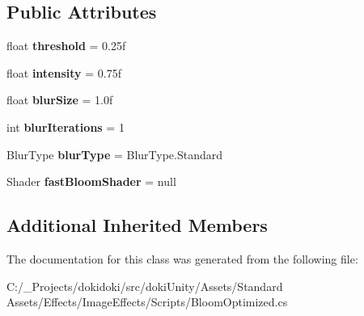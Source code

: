 \subsection*{Public Attributes}
\begin{DoxyCompactItemize}
\item 
float {\bfseries threshold} = 0.\+25f\hypertarget{class_unity_standard_assets_1_1_image_effects_1_1_bloom_optimized_a0ef0dd7b3e5ffb8f00cf4205470801ee}{}\label{class_unity_standard_assets_1_1_image_effects_1_1_bloom_optimized_a0ef0dd7b3e5ffb8f00cf4205470801ee}

\item 
float {\bfseries intensity} = 0.\+75f\hypertarget{class_unity_standard_assets_1_1_image_effects_1_1_bloom_optimized_a8ec9def7b3e5665976eafa9d258fd394}{}\label{class_unity_standard_assets_1_1_image_effects_1_1_bloom_optimized_a8ec9def7b3e5665976eafa9d258fd394}

\item 
float {\bfseries blur\+Size} = 1.\+0f\hypertarget{class_unity_standard_assets_1_1_image_effects_1_1_bloom_optimized_ad48371677d49eada1100c19f3f8a977c}{}\label{class_unity_standard_assets_1_1_image_effects_1_1_bloom_optimized_ad48371677d49eada1100c19f3f8a977c}

\item 
int {\bfseries blur\+Iterations} = 1\hypertarget{class_unity_standard_assets_1_1_image_effects_1_1_bloom_optimized_a8ff2522b67093656401cd6d2639ebb78}{}\label{class_unity_standard_assets_1_1_image_effects_1_1_bloom_optimized_a8ff2522b67093656401cd6d2639ebb78}

\item 
Blur\+Type {\bfseries blur\+Type} = Blur\+Type.\+Standard\hypertarget{class_unity_standard_assets_1_1_image_effects_1_1_bloom_optimized_acb813777e2dbedf40aecc524f7551af6}{}\label{class_unity_standard_assets_1_1_image_effects_1_1_bloom_optimized_acb813777e2dbedf40aecc524f7551af6}

\item 
Shader {\bfseries fast\+Bloom\+Shader} = null\hypertarget{class_unity_standard_assets_1_1_image_effects_1_1_bloom_optimized_a68b688b90f439f8b2364d1aa275a69e0}{}\label{class_unity_standard_assets_1_1_image_effects_1_1_bloom_optimized_a68b688b90f439f8b2364d1aa275a69e0}

\end{DoxyCompactItemize}
\subsection*{Additional Inherited Members}


The documentation for this class was generated from the following file\+:\begin{DoxyCompactItemize}
\item 
C\+:/\+\_\+\+Projects/dokidoki/src/doki\+Unity/\+Assets/\+Standard Assets/\+Effects/\+Image\+Effects/\+Scripts/Bloom\+Optimized.\+cs\end{DoxyCompactItemize}
